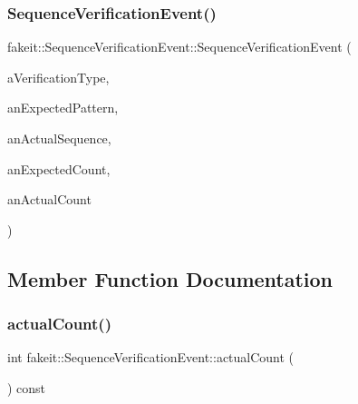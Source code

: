 \mbox{\label{structfakeit_1_1SequenceVerificationEvent_ab0842bb20a84757c265ecdee00f41c91}} 
\subsubsection{\texorpdfstring{SequenceVerificationEvent()}{SequenceVerificationEvent()}\hspace{0.1cm}{\footnotesize\ttfamily [9/9]}}
{\footnotesize\ttfamily fakeit\+::\+Sequence\+Verification\+Event\+::\+Sequence\+Verification\+Event (\begin{DoxyParamCaption}\item[{\mbox{\hyperlink{namespacefakeit_a9df22520dd60badb149c1d1d2518b253}{Verification\+Type}}}]{a\+Verification\+Type,  }\item[{std\+::vector$<$ \mbox{\hyperlink{classfakeit_1_1Sequence}{Sequence}} $\ast$ $>$ \&}]{an\+Expected\+Pattern,  }\item[{std\+::vector$<$ \mbox{\hyperlink{structfakeit_1_1Invocation}{Invocation}} $\ast$ $>$ \&}]{an\+Actual\+Sequence,  }\item[{int}]{an\+Expected\+Count,  }\item[{int}]{an\+Actual\+Count }\end{DoxyParamCaption})\hspace{0.3cm}{\ttfamily [inline]}}



\subsection{Member Function Documentation}
\mbox{\label{structfakeit_1_1SequenceVerificationEvent_a4f7daa947cca317c30e74ee66540d3b9}} 
\subsubsection{\texorpdfstring{actualCount()}{actualCount()}\hspace{0.1cm}{\footnotesize\ttfamily [1/9]}}
{\footnotesize\ttfamily int fakeit\+::\+Sequence\+Verification\+Event\+::actual\+Count (\begin{DoxyParamCaption}{ }\end{DoxyParamCaption}) const\hspace{0.3cm}{\ttfamily [inline]}}


